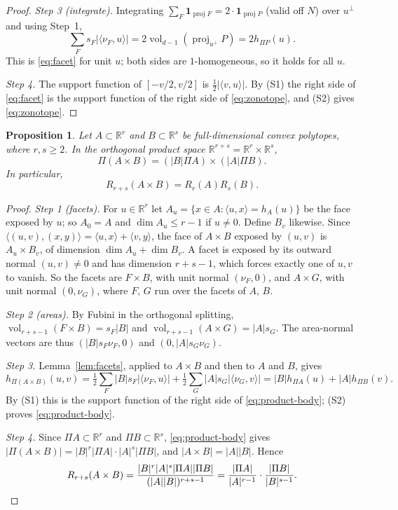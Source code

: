 \documentclass[11pt]{article}
\newtheorem{proposition}[theorem]{Proposition}
\newcommand{\R}{\mathbb R}
\DeclareMathOperator{\vol}{vol}
\DeclareMathOperator{\proj}{proj}
\begin{document}
\begin{proof}
\emph{Step 3 (integrate).} Integrating \(\sum_F\mathbf 1_{\proj F}=2\cdot\mathbf 1_{\proj P}\) (valid off \(N\)) over \(u^\perp\) and using Step~1,
\[
 \sum_Fs_F|\langle\nu_F,u\rangle|=2\vol_{d-1}(\proj_{u^\perp}P)=2h_{\Pi P}(u).
\]
This is \eqref{eq:facet} for unit \(u\); both sides are \(1\)-homogeneous, so it holds for all \(u\).

\emph{Step 4.} The support function of \([-v/2,v/2]\) is \(\tfrac12|\langle v,u\rangle|\). By (S1) the right side of \eqref{eq:facet} is the support function of the right side of \eqref{eq:zonotope}, and (S2) gives \eqref{eq:zonotope}.
\end{proof}

\begin{proposition}\label{prop:product}
Let \(A\subset\R^r\) and \(B\subset\R^s\) be full-dimensional convex polytopes, where \(r,s\ge2\). In the orthogonal product space \(\R^{r+s}=\R^r\times\R^s\),
\begin{equation}\label{eq:product-body}
 \Pi(A\times B)=(|B|\Pi A)\times(|A|\Pi B).
\end{equation}
In particular,
\begin{equation}\label{eq:multiplicative}
 R_{r+s}(A\times B)=R_r(A)R_s(B).
\end{equation}
\end{proposition}

\begin{proof}
\emph{Step 1 (facets).} For \(u\in\R^r\) let \(A_u=\{x\in A:\langle u,x\rangle=h_A(u)\}\) be the face exposed by \(u\); so \(A_0=A\) and \(\dim A_u\le r-1\) if \(u\ne0\). Define \(B_v\) likewise. Since \(\langle(u,v),(x,y)\rangle=\langle u,x\rangle+\langle v,y\rangle\), the face of \(A\times B\) exposed by \((u,v)\) is \(A_u\times B_v\), of dimension \(\dim A_u+\dim B_v\). A facet is exposed by its outward normal \((u,v)\ne0\) and has dimension \(r+s-1\), which forces exactly one of \(u,v\) to vanish. So the facets are \(F\times B\), with unit normal \((\nu_F,0)\), and \(A\times G\), with unit normal \((0,\nu_G)\), where \(F\), \(G\) run over the facets of \(A\), \(B\).

\emph{Step 2 (areas).} By Fubini in the orthogonal splitting, \(\vol_{r+s-1}(F\times B)=s_F|B|\) and \(\vol_{r+s-1}(A\times G)=|A|s_G\). The area-normal vectors are thus \((|B|s_F\nu_F,0)\) and \((0,|A|s_G\nu_G)\).

\emph{Step 3.} Lemma~\ref{lem:facets}, applied to \(A\times B\) and then to \(A\) and \(B\), gives
\[
 h_{\Pi(A\times B)}(u,v)
 =\tfrac12\sum_F|B|s_F|\langle\nu_F,u\rangle|+\tfrac12\sum_G|A|s_G|\langle\nu_G,v\rangle|
 =|B|h_{\Pi A}(u)+|A|h_{\Pi B}(v).
\]
By (S1) this is the support function of the right side of \eqref{eq:product-body}; (S2) proves \eqref{eq:product-body}.

\emph{Step 4.} Since \(\Pi A\subset\R^r\) and \(\Pi B\subset\R^s\), \eqref{eq:product-body} gives \(|\Pi(A\times B)|=|B|^r|\Pi A|\cdot|A|^s|\Pi B|\), and \(|A\times B|=|A||B|\). Hence
\[
 R_{r+s}(A\times B)
 =\frac{|B|^r|A|^s|\Pi A||\Pi B|}{(|A||B|)^{r+s-1}}
 =\frac{|\Pi A|}{|A|^{r-1}}\cdot\frac{|\Pi B|}{|B|^{s-1}}.\qedhere
\]
\end{proof}
\end{document}

